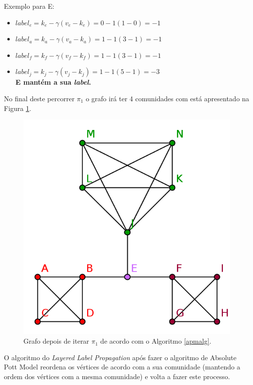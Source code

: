   Exemplo para E:
  \begin{itemize}
   \item $label_e = k_e - \gamma ( v_e - k_e ) = 0 - 1 ( 1 - 0) = -1$
   \item $label_a = k_a - \gamma ( v_a - k_a ) = 1 - 1 ( 3 - 1) = -1$
   \item $label_f = k_f - \gamma ( v_f - k_f ) = 1 - 1 ( 3 - 1) = -1$ 
   \item $label_j = k_j - \gamma ( v_j - k_j ) = 1 - 1 ( 5 - 1) = -3$\\
   {\bf E mantém a sua \textit{label}.}
  \end{itemize}
  
  No final deste percorrer $\pi_1$ o grafo irá ter 4 comunidades com está 
  apresentado na Figura \ref{graphfinalllp}.
  
  \begin{figure}[H]
    \center
    \includegraphics{graph_stepFinal.png}
    \caption{Grafo depois de iterar $\pi_1$ de acordo com o Algoritmo \ref{apmalg}.}
    \label{graphfinalllp}
  \end{figure}
  
  O algoritmo do \textit{Layered Label Propagation} após fazer o algoritmo de
  Absolute Pott Model reordena os vértices de acordo com a sua comunidade 
(mantendo a ordem dos vértices com a mesma comunidade) e volta a fazer este 
processo.

